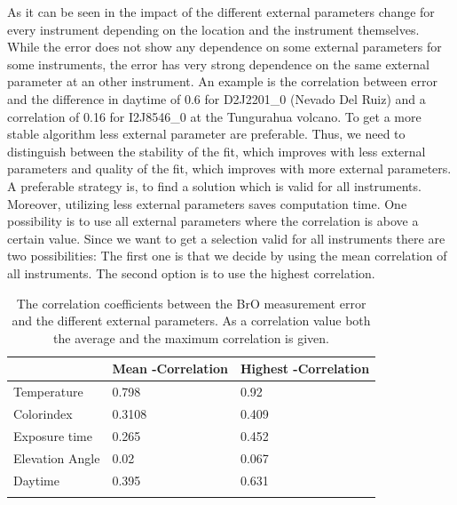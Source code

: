 \documentclass  [
  paper    = a4,
  BCOR     = 10mm,
  twoside,
  fontsize = 12pt,
  fleqn,
  toc      = bibnumbered,
  toc      = listofnumbered,
  numbers  = noendperiod,
  headings = normal,
  listof   = leveldown,
  version  = 3.03
]                                       {scrreprt}
\begin{document}
	As it can be seen in  the impact of the different external parameters change for every instrument depending on the location and the instrument themselves. 
	While the   error does not show any dependence on some external parameters for some instruments, the error has very strong dependence on the same external parameter at an other instrument. An example is the correlation between   error and the difference in daytime of 0.6 for D2J2201\_0 (Nevado Del Ruiz) and a correlation of 0.16 for I2J8546\_0 at the Tungurahua volcano.
	To get a more stable algorithm less external parameter are preferable. Thus, we need to distinguish between the stability of the fit, which improves with less external parameters and quality of the fit, which improves with more external parameters. 
	A preferable strategy is, to find a solution which is valid for all instruments. Moreover, utilizing less external parameters saves computation time.
	One possibility is to use all external parameters where the correlation is above a certain value. Since we want to get a selection valid for all instruments there are two possibilities: The first one is that we decide by using the mean correlation of all instruments. The second option is to use the highest correlation.
	
	\begin{table}[h]
		\centering
		\begin{tabular}{|p{4cm}|p{3cm}|p{3cm}|}
			&  Mean -Correlation&  Highest   -Correlation\\
			\toprule
			Temperature &0.798&	0.92\\
			\midrule
			Colorindex &0.3108&	0.409\\
			\midrule
			Exposure time &0.265&	0.452\\
			\midrule
			Elevation Angle &0.02&	0.067\\
			\midrule
			Daytime &0.395&	0.631\\
			\bottomrule
			\label{tab:CorrEP}
		\end{tabular}
	\caption{The correlation coefficients between the BrO measurement error and the different external parameters. As a correlation value both the average and the maximum correlation is given.}
	\end{table}
\end{document}
